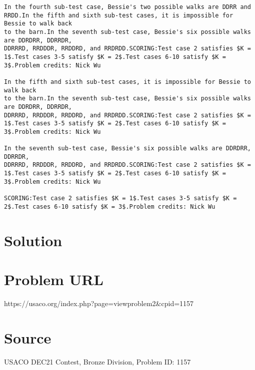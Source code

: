 \documentclass[12pt]{article}
\begin{document}
\begin{verbatim}
In the fourth sub-test case, Bessie's two possible walks are DDRR and RRDD.In the fifth and sixth sub-test cases, it is impossible for Bessie to walk back
to the barn.In the seventh sub-test case, Bessie's six possible walks are DDRDRR, DDRRDR,
DDRRRD, RRDDDR, RRDDRD, and RRDRDD.SCORING:Test case 2 satisfies $K = 1$.Test cases 3-5 satisfy $K = 2$.Test cases 6-10 satisfy $K = 3$.Problem credits: Nick Wu

In the fifth and sixth sub-test cases, it is impossible for Bessie to walk back
to the barn.In the seventh sub-test case, Bessie's six possible walks are DDRDRR, DDRRDR,
DDRRRD, RRDDDR, RRDDRD, and RRDRDD.SCORING:Test case 2 satisfies $K = 1$.Test cases 3-5 satisfy $K = 2$.Test cases 6-10 satisfy $K = 3$.Problem credits: Nick Wu

In the seventh sub-test case, Bessie's six possible walks are DDRDRR, DDRRDR,
DDRRRD, RRDDDR, RRDDRD, and RRDRDD.SCORING:Test case 2 satisfies $K = 1$.Test cases 3-5 satisfy $K = 2$.Test cases 6-10 satisfy $K = 3$.Problem credits: Nick Wu

SCORING:Test case 2 satisfies $K = 1$.Test cases 3-5 satisfy $K = 2$.Test cases 6-10 satisfy $K = 3$.Problem credits: Nick Wu
\end{verbatim}

\section*{Solution}


\section*{Problem URL}
https://usaco.org/index.php?page=viewproblem2&cpid=1157

\section*{Source}
USACO DEC21 Contest, Bronze Division, Problem ID: 1157
\end{document}
